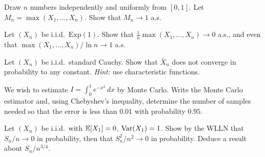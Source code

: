 \begin{exercise}
Draw $n$ numbers independently and uniformly from $[0,1]$. Let
$M_n = \max(X_1, \ldots, X_n)$. Show that $M_n \to 1$ a.s.
\end{exercise}

\begin{exercise}
Let $(X_n)$ be i.i.d.\ $\mathrm{Exp}(1)$. Show that
$\frac{1}{n}\max(X_1, \ldots, X_n) \to 0$ a.s., and even that
$\max(X_1,\ldots,X_n)/\ln n \to 1$ a.s.
\end{exercise}

\begin{exercise}
Let $(X_n)$ be i.i.d.\ standard Cauchy. Show that $\bar{X}_n$ does not converge
in probability to any constant.
\textit{Hint:} use characteristic functions.
\end{exercise}

\begin{exercise}
We wish to estimate $I = \int_0^1 e^{-x^2}\,dx$ by Monte Carlo. Write the
Monte Carlo estimator and, using Chebyshev's inequality, determine the number of
samples needed so that the error is less than $0.01$ with probability $0.95$.
\end{exercise}

\begin{exercise}
Let $(X_n)$ be i.i.d.\ with $\mathbb{E}[X_1] = 0$, $\mathrm{Var}(X_1) = 1$. Show by the WLLN
that $S_n/n \to 0$ in probability, then that $S_n^2/n^2 \to 0$ in probability.
Deduce a result about $S_n/n^{3/4}$.
\end{exercise}
